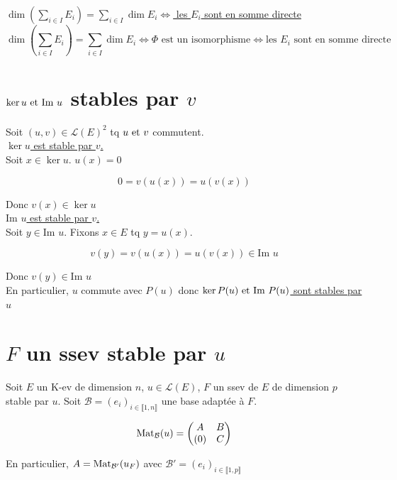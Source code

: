 \documentclass[]{article}
\begin{document}
\underline{$\dim(\sum_{i \in I}E_i) = \sum_{i \in I} \dim E_i \iff $ les $E_i$ sont en somme directe} \\

\[ \dim(\sum_{i \in I}E_i) = \sum_{i \in I} \dim E_i \iff \Phi \text{ est un isomorphisme} \iff \text{les } E_i \text{ sont en somme directe} \]

\section{$\ker u \text{ et } \text{Im } u$ stables par $v$}

Soit $(u, v) \in \mathcal{L}(E)^2$ tq $u \text{ et } v$ commutent. \\

\underline{$\ker u$ est stable par $v$.} \\

Soit $x \in \ker u$. $u(x) = 0$

\[ 0 = v(u(x)) = u(v(x)) \]

Donc $v(x) \in \ker u$ \\

\underline{$\text{Im } u$ est stable par $v$.} \\

Soit $y \in \text{Im } u$. Fixons $x \in E$ tq $y = u(x)$.

\[ v(y) = v(u(x)) = u(v(x)) \in \text{Im } u \]

Donc $v(y) \in \text{Im } u$ \\

En particulier, $u$ commute avec $P(u)$ donc \underline{$\ker P(u) \text{ et } \text{Im } P(u)$ sont stables par $u$}

\section{$F$ un ssev stable par $u$}

Soit $E$ un K-ev de dimension $n$, $u \in \mathcal{L}(E)$, $F$ un ssev de $E$ de dimension $p$ stable par $u$. Soit $\mathcal{B} = (e_i)_{i \in \llbracket 1, n \rrbracket}$ une base adaptée à $F$. 

\[ \text{Mat}_{\mathcal{B}}(u) = \begin{pmatrix}
    A & B \\
    (0) & C
\end{pmatrix} \]

En particulier, $A = \text{Mat}_{\mathcal{B}'}(u_F)$ avec $\mathcal{B}' = (e_i)_{i \in \llbracket 1, p \rrbracket}$ \\
\end{document}
